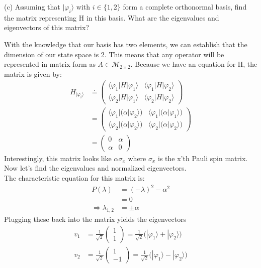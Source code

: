 \documentclass[a4paper, 11pt]{article}
\newcommand{\ket}[1]{|#1\rangle}
\newcommand{\bra}[1]{\langle #1 |}
\newenvironment{solution}{%
	\begin{list}{}{%
			\setlength{\topsep}{0pt}%
			\setlength{\leftmargin}{1.5cm}%
			\setlength{\rightmargin}{1.5cm}%
			\setlength{\listparindent}{\parindent}%
			\setlength{\itemindent}{\parindent}%
			\setlength{\parsep}{\parskip}%
	}%
	\item[]}{\end{list}}
\begin{document}
\noindent(c) Assuming that $\ket{\varphi_i}$ with $i\in\{1,2\}$ form a complete orthonormal basis, find the matrix representing H in this basis. What are the eigenvalues and eigenvectors of this matrix?  \\ 
	\begin{solution}
		\noindent With the knowledge that our basis has two elements, we can establish that the dimension of our state space is 2. This means that any operator will be represented in matrix form as $A\in\mathcal{M}_{2\times2}$. Because we have an equation for H, the matrix is given by:
			\begin{align*}
				H_{\ket{\varphi_i}} &\doteq \begin{pmatrix}
					\bra{\varphi_1}H\ket{\varphi_1} & \bra{\varphi_1}H\ket{\varphi_2} \\ 
					\bra{\varphi_2}H\ket{\varphi_1} & \bra{\varphi_2}H\ket{\varphi_2} 
				\end{pmatrix} \\ 
				&= \begin{pmatrix}
					\bra{\varphi_1}\big(\alpha\ket{\varphi_2}\big) & \bra{\varphi_1}\big(\alpha\ket{\varphi_1}\big) \\ 
					\bra{\varphi_2}\big(\alpha\ket{\varphi_2}\big) & 
					\bra{\varphi_2}\big(\alpha\ket{\varphi_2}\big)
				\end{pmatrix} \\ 
				&= \begin{pmatrix}
					0 & \alpha \\ 
					\alpha & 0
				\end{pmatrix}
			\end{align*}
		Interestingly, this matrix looks like $\alpha\sigma_x$ where $\sigma_x$ is the x'th Pauli spin matrix. Now let's find the eigenvalues and normalized eigenvectors. \\ 
		
		\noindent The characteristic equation for this matrix is: 
			\begin{align*}
				P(\lambda) &= (-\lambda)^2-\alpha^2 \\ 
						&= 0 \\ 
				\Rightarrow \lambda_{1,2} &= \pm \alpha 
			\end{align*}
		Plugging these back into the matrix yields the eigenvectors 
			\begin{align*}
				\mathit{v}_1 &= \frac{1}{\sqrt{2}}\begin{pmatrix} 1 \\ 1 \end{pmatrix} = \frac{1}{\sqrt{2}}\big( \ket{\varphi_1} + \ket{\varphi_2}\big)\\
				\mathit{v}_2 &= \frac{1}{\sqrt{2}}\begin{pmatrix} 1 \\  -1\end{pmatrix} = \frac{1}{\sqrt{2}}\big(\ket{\varphi_1}-\ket{\varphi_2}\big)
			\end{align*}
	\end{solution} 
\end{document}
